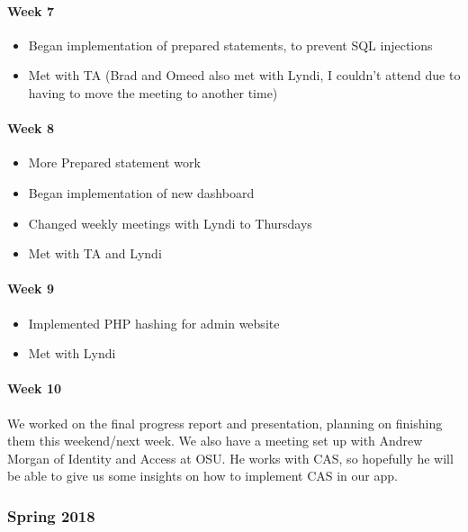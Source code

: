 \documentclass[onecolumn, draftclsnofoot,10pt, compsoc]{IEEEtran}
\begin{document}
      \paragraph{Week 7}
        \begin{itemize}
          \item Began implementation of prepared statements, to prevent SQL injections
          \item Met with TA (Brad and Omeed also met with Lyndi, I couldn't attend due to having to move the meeting to another time)
        \end{itemize}

      \paragraph{Week 8}
        \begin{itemize}
          \item More Prepared statement work
          \item Began implementation of new dashboard
          \item Changed weekly meetings with Lyndi to Thursdays
          \item Met with TA and Lyndi
        \end{itemize}

      \paragraph{Week 9}
        \begin{itemize}
          \item Implemented PHP hashing for admin website
          \item Met with Lyndi
        \end{itemize}

      \paragraph{Week 10}
      We worked on the final progress report and presentation, planning on finishing them this weekend/next week. We also have a meeting set up with Andrew Morgan of Identity and Access at OSU. He works with CAS, so hopefully he will be able to give us some insights on how to implement CAS in our app.

    \subsubsection{Spring 2018}
\end{document}
